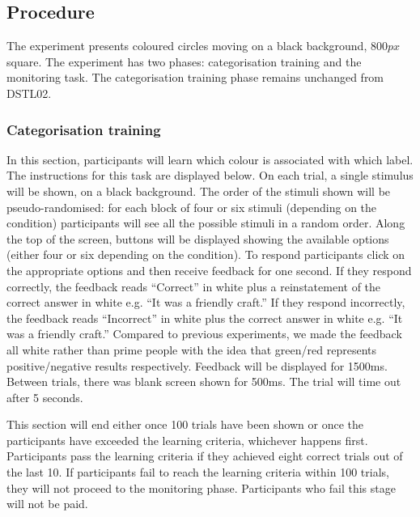 \documentclass[doc, a4paper, apacite]{apa6}
\begin{document}
\subsection{Procedure}

The experiment presents coloured circles moving on a black background, $800px$ square. 
The experiment has two phases: categorisation training and the monitoring task.
The categorisation training phase remains unchanged from DSTL02.  

\subsubsection{Categorisation training}
In this section, participants will learn which colour is associated with which label. 
The instructions for this task are displayed below. 
On each trial, a single stimulus will be shown, on a black background. 
The order of the stimuli shown will be pseudo-randomised: for each block of four or six stimuli (depending on the condition) participants will see all the possible stimuli in a random order. 
Along the top of the screen, buttons will be displayed showing the available options (either four or six depending on the condition). 
To respond participants click on the appropriate options and then receive feedback for one second. 
If they respond correctly, the feedback reads ``Correct'' in white plus a reinstatement of the correct answer in white e.g. ``It was a friendly craft.'' 
If they respond incorrectly, the feedback reads ``Incorrect'' in white plus the correct answer in white e.g. ``It was a friendly craft.''
Compared to previous experiments, we made the feedback all white rather than prime people with the idea that green/red represents positive/negative results respectively.
Feedback will be displayed for 1500ms.
Between trials, there was blank screen shown for 500ms. 
The trial will time out after 5 seconds. 

This section will end either once 100 trials have been shown or once the participants have exceeded the learning criteria, whichever happens first. 
Participants pass the learning criteria if they achieved eight correct trials out of the last 10. 
If participants fail to reach the learning criteria within 100 trials, they will not proceed to the monitoring phase.
Participants who fail this stage will not be paid. 
\end{document}
